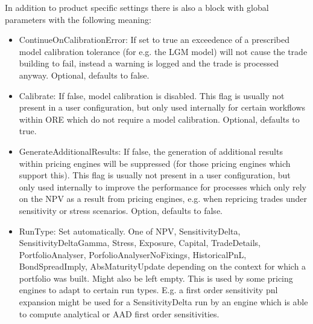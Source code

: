 In addition to product specific settings there is also a block with global parameters with the following meaning:

\begin{itemize}
\item ContinueOnCalibrationError: If set to true an exceedence of a prescribed model calibration tolerance (for e.g. the
  LGM model) will not cause the trade building to fail, instead a warning is logged and the trade is processed
  anyway. Optional, defaults to false.
\item Calibrate: If false, model calibration is disabled. This flag is usually not present in a user configuration, but
  only used internally for certain workflows within ORE which do not require a model calibration. Optional, defaults to
  true.
\item GenerateAdditionalResults: If false, the generation of additional results within pricing engines will be
  suppressed (for those pricing engines which support this). This flag is usually not present in a user configuration,
  but only used internally to improve the performance for processes which only rely on the NPV as a result from pricing
  engines, e.g. when repricing trades under sensitivity or stress scenarios. Option, defaults to false.
\item RunType: Set automatically. One of NPV, SensitivityDelta, SensitivityDeltaGamma, Stress, Exposure, Capital,
  TradeDetails, PortfolioAnalyser, PorfolioAnalyserNoFixings, HistoricalPnL, BondSpreadImply, AbsMaturityUpdate
  depending on the context for which a portfolio was built. Might also be left empty. This is used by some pricing
  engines to adapt to certain run types. E.g. a first order sensitivity pnl expansion might be used for a
  SensitivityDelta run by an engine which is able to compute analytical or AAD first order sensitivities.
\end{itemize}
